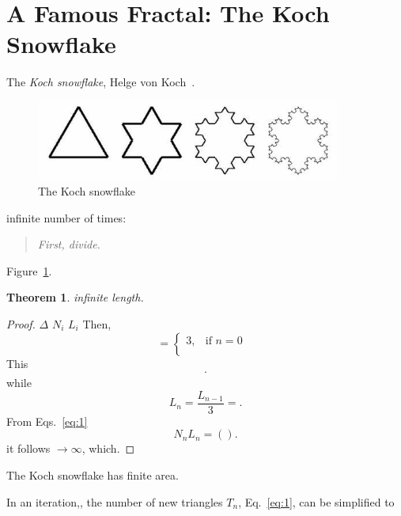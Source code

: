\documentclass[12pt,a4paper]{article}
\newtheorem{theorem}{Theorem}
\begin{document}
\section{A Famous Fractal: The Koch Snowflake}

The \emph{Koch snowflake},
Helge von Koch~\cite{koch}.  
\begin{figure}[h] \label{koch}
  \centering
  \includegraphics[width=10cm]{snowflake.jpg}
  \caption{The Koch snowflake }
\end{figure}
infinite number of times:
\begin{quote}
 \textit{First, divide.}
\end{quote}
Figure~\ref{koch}.

\begin{theorem}
  infinite length. 
\end{theorem}
\begin{proof}
  $\Delta$
  $N_i$ 
  $L_i$
  Then, 
  \begin{displaymath}
    =
    \begin{cases}
      3, & \text{if $n=0$ } \\
    \end{cases}
  \end{displaymath}
  This 
  \begin{equation}
    \label{eq:1}
    \cdot
  \end{equation}
   while  
  \begin{equation}
    \label{eq:5}
    L_n = \frac{L_{n-1}}{3} =.
  \end{equation}
  From Eqs.~\ref{eq:1}  
  \begin{displaymath}
    N_nL_n =
    \left(      \right)
    .
  \end{displaymath}
  it follows $\to \infty$, which.
\end{proof}

  The Koch snowflake has finite area. 

  
  In an iteration,, the number of new triangles $T_n$,
    Eq.~\ref{eq:1}, can be simplified to 

    \label{eq:2}
\end{document}
